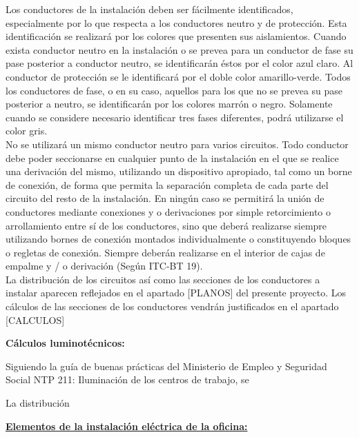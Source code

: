 Los conductores de la instalación deben ser fácilmente identificados, especialmente por lo que respecta a los conductores neutro y de protección. Esta identificación se realizará por los colores que presenten sus aislamientos. Cuando exista conductor neutro en la instalación o se prevea para un conductor de fase su pase posterior a conductor neutro, se identificarán éstos por el color azul claro. Al conductor de protección se le identificará por el doble color amarillo-verde. Todos los conductores de fase, o en su caso, aquellos para los que no se prevea su pase posterior a neutro, se identificarán por los colores marrón o negro. Solamente cuando se considere necesario identificar tres fases diferentes, podrá utilizarse el color gris.\\

No se utilizará un mismo conductor neutro para varios circuitos. Todo conductor debe poder seccionarse en cualquier punto de la instalación en el que se realice una derivación del mismo, utilizando un dispositivo apropiado, tal como un borne de conexión, de forma que permita la separación completa de cada parte del circuito del resto de la instalación. En ningún caso se permitirá la unión de conductores mediante conexiones y o derivaciones por simple retorcimiento o arrollamiento entre sí de los conductores, sino que deberá realizarse siempre utilizando bornes de conexión montados individualmente o constituyendo bloques o regletas de conexión. Siempre deberán realizarse en el interior de cajas de empalme y / o derivación (Según ITC-BT 19).\\

La distribución de los circuitos así como las secciones de los conductores a instalar aparecen reflejados en el apartado [PLANOS] del presente proyecto. Los cálculos de las secciones de los conductores vendrán justificados en el apartado [CALCULOS]\pagebreak





{\bfseries Cálculos luminotécnicos:}

Siguiendo la guía de buenas prácticas del Ministerio de Empleo y Seguridad Social NTP 211: Iluminación de los centros de trabajo, se

La distribución 







\underline{\bfseries Elementos de la instalación eléctrica de la oficina:}\\


